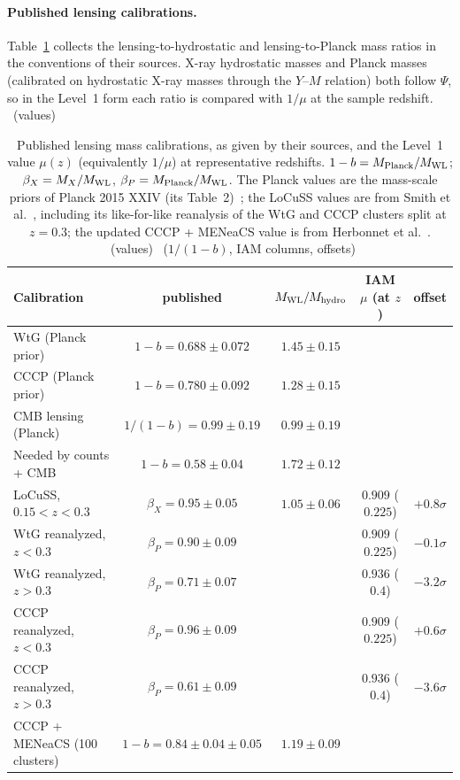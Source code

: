 \paragraph{Published lensing calibrations.} Table~\ref{tab:ld_published} collects the lensing-to-hydrostatic and lensing-to-Planck mass ratios in the
conventions of their sources. X-ray hydrostatic masses and Planck masses (calibrated on hydrostatic X-ray masses through the $Y$--$M$ relation) both
follow $\Psi$, so in the Level~1 form each ratio is compared with $1/\mu$ at the sample redshift. \observed\ (values)

\begin{table}[htbp]\centering\small
\caption[Published cluster mass ratios against the Level 1 form]{Published lensing mass calibrations, as given by their sources, and the
Level~1 value $\mu(z)$ (equivalently $1/\mu$) at representative redshifts. $1-b=M_{\rm Planck}/M_{\rm WL}$; $\beta_X=M_X/M_{\rm WL}$, $\beta_P=M_{\rm Planck}/M_{\rm WL}$.
The Planck values are the mass-scale priors of Planck 2015 XXIV (its Table~2)~\cite{Planck2015SZ}; the LoCuSS values are from Smith et al.~\cite{Smith2016LoCuSS},
including its like-for-like reanalysis of the WtG and CCCP clusters split at $z=0.3$; the updated CCCP + MENeaCS value is from Herbonnet et al.~\cite{Herbonnet2020}.
\observed\ (values) \calc\ ($1/(1-b)$, IAM columns, offsets)}\label{tab:ld_published}
\begin{tabularx}{\linewidth}{>{\raggedright\arraybackslash}Xcccc}\toprule
Calibration & published & $M_{\rm WL}/M_{\rm hydro}$ & IAM $\mu$ (at $z$) & offset\\\midrule
WtG (Planck prior) & $1-b=0.688\pm0.072$ & $1.45\pm0.15$ & & \\
CCCP (Planck prior) & $1-b=0.780\pm0.092$ & $1.28\pm0.15$ & & \\
CMB lensing (Planck) & $1/(1-b)=0.99\pm0.19$ & $0.99\pm0.19$ & & \\
Needed by counts + CMB & $1-b=0.58\pm0.04$ & $1.72\pm0.12$ & & \\
LoCuSS, $0.15<z<0.3$ & $\beta_X=0.95\pm0.05$ & $1.05\pm0.06$ & $0.909$ ($0.225$) & $+0.8\sigma$\\
WtG reanalyzed, $z<0.3$ & $\beta_P=0.90\pm0.09$ & & $0.909$ ($0.225$) & $-0.1\sigma$\\
WtG reanalyzed, $z>0.3$ & $\beta_P=0.71\pm0.07$ & & $0.936$ ($0.4$) & $-3.2\sigma$\\
CCCP reanalyzed, $z<0.3$ & $\beta_P=0.96\pm0.09$ & & $0.909$ ($0.225$) & $+0.6\sigma$\\
CCCP reanalyzed, $z>0.3$ & $\beta_P=0.61\pm0.09$ & & $0.936$ ($0.4$) & $-3.6\sigma$\\
CCCP + MENeaCS (100 clusters) & $1-b=0.84\pm0.04\pm0.05$ & $1.19\pm0.09$ & & \\\bottomrule
\end{tabularx}\end{table}

